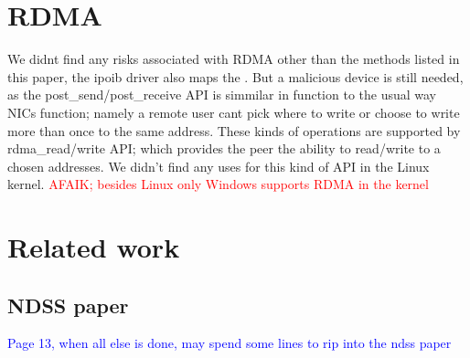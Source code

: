 
\section{RDMA}
We didnt find any risks associated with RDMA other than the methods listed in this paper, the ipoib driver also maps the \shinfo. But a malicious device is still needed, as the post\_send/post\_receive API is simmilar in function to the usual way NICs function; namely a remote user cant pick where to write or choose to write more than once to the same address. These kinds of operations are supported by rdma\_read/write API; which provides the peer the ability to read/write to a chosen addresses. We didn't find any uses for this kind of API in the Linux kernel. \textcolor{red}{AFAIK; besides Linux only Windows supports RDMA in the kernel}

\section{Related work}
\subsection{NDSS paper}
\textcolor{blue}{Page 13, when all else is done, may spend some lines to rip into the ndss paper}
